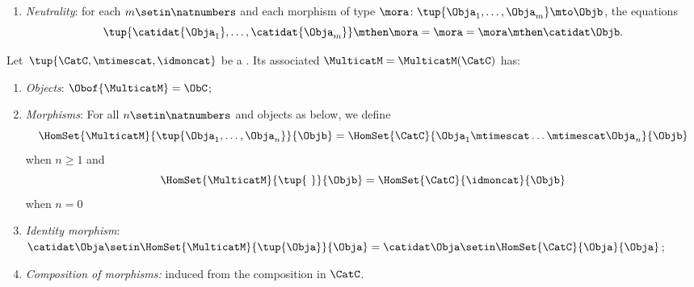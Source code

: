 {\begin{ctdefinition}[Multicategory]
\begin{enumerate}
\begin{equation}
                  \begin{aligned}
                      \tup{ \tup{\mora_{1}^1,\ldots, \mora_{n_1}^1} \mthen \morb_1, \tup{\mora_{1}^2,\ldots, \mora_{n_2}^2 }\mthen \morb_2,\ldots, \tup{ \mora_{1}^m,\ldots, \mora_{n_m}^m } \mthen \morb_m } \mthen \morc \\ = \ \tup{ \mora_{1}^1,\ldots, \mora_{n_m}^m } \mthen \left ( \tup{ \morb_{1},\ldots, \morb_{m} } \mthen \morc \right ).
                  \end{aligned}
              \end{equation}
        \item \emph{Neutrality}: for each $m \setin \natnumbers$ and each morphism of type $\mora \colon \tup{\Obja_1,\ldots,\Obja_m}\mto \Objb$, the equations
              \begin{equation}
                  \tup{\catidat{\Obja_1},\ldots, \catidat{\Obja_m}}
                  \mthen \mora = \mora = \mora \mthen \catidat\Objb.
              \end{equation}
    \end{enumerate}
\end{ctdefinition}

\begin{ctdefinition}
    \label{def:multicat_from_monoidal}
    Let~$\tup{\CatC, \mtimescat, \idmoncat}$ be a .
    Its associated  $\MulticatM = \MulticatM(\CatC)$ has:
    \begin{enumerate}
        \item \emph{Objects}: $\Obof{\MulticatM}=\ObC$;
        \item \emph{Morphisms}: For all $n \setin \natnumbers$ and objects as below, we define
              $$\HomSet{\MulticatM}{\tup{\Obja_1,\ldots,\Obja_n}}{\Objb}=\HomSet{\CatC}{\Obja_1 \mtimescat \ldots \mtimescat \Obja_n}{\Objb}$$ when $n \geq 1$ and
              $$\HomSet{\MulticatM}{\tup{ \ }}{\Objb} = \HomSet{\CatC}{\idmoncat}{\Objb} $$
              when $n=0$
        \item \emph{Identity morphism}: $\catidat\Obja \setin \HomSet{\MulticatM}{\tup{\Obja}}{\Obja}=\catidat\Obja \setin \HomSet{\CatC}{\Obja}{\Obja}$;
        \item \emph{Composition of morphisms:} induced from the composition in $\CatC$.
    \end{enumerate}
\end{ctdefinition}


}
